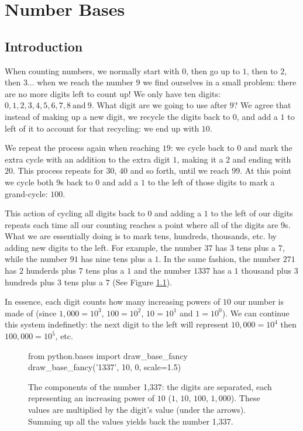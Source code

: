 %

\chapter{Number Bases}
\section{Introduction}
When counting numbers, we normally start with $0$, then go up to $1$, then to $2$, then $3$... when we reach the number $9$ we find ourselves in a small problem: there are no more digits left to count up! We only have ten digits: $0,1,2,3,4,5,6,7,8\ \text{and}\ 9$. What digit are we going to use after $9$? We agree that instead of making up a new digit, we recycle the digits back to $0$, and add a $1$ to left of it to account for that recycling: we end up with $10$. \par

We repeat the process again when reaching $19$: we cycle back to $0$ and mark the extra cycle with an addition to the extra digit $1$, making it a $2$ and ending with $20$. This process repeats for $30$, $40$ and so forth, until we reach $99$. At this point we cycle both $9$s back to $0$ and add a $1$ to the left of those digits to mark a grand-cycle: $100$. \par

This action of cycling all digits back to $0$ and adding a $1$ to the left of our digits repeats each time all our counting reaches a point where all of the digits are $9$s. What we are essentially doing is to mark tens, hundreds, thousands, etc. by adding new digits to the left. For example, the number $37$ has $3$ tens plus a $7$, while the number $91$ has nine tens plus a $1$. In the same fashion, the number $271$ has $2$ hunderds plus $7$ tens plus a $1$ and the number $1337$ has a $1$ thousand plus $3$ hundreds plus $3$ tens plus a $7$ (See Figure \ref{fig:components of 1337}). \par
In essence, each digit counts how many increasing powers of $10$ our number is made of (since $1,000=10^{3}$, $100=10^{2}$, $10=10^{1}$ and $1=10^{0}$). We can continue this system indefinetly: the next digit to the left will represent $10,000=10^{4}$ then $100,000=10^{5}$, etc. \par

\begin{figure}
  \centering
  \begin{pycode}
from python.bases import draw_base_fancy
draw_base_fancy('1337', 10, 0, scale=1.5)
  \end{pycode}
  \label{fig:components of 1337}
  \caption[Components of 1,337]{The components of the number 1,337: the digits are separated, each representing an increasing power of $10$ ($1$, $10$, $100$, $1,000$). These values are multiplied by the digit's value (under the arrows). Summing up all the values yields back the number 1,337.}
\end{figure}


